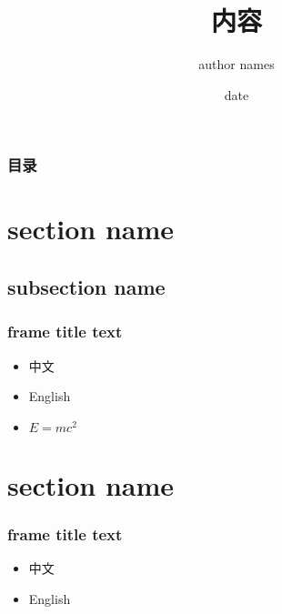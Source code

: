 ﻿\documentclass[14pt]{beamer}
\begin{document}
\title{内容}
\author{author names}
\date{date}
\maketitle
\begin{frame}\frametitle{目录}
\tableofcontents
\end{frame}
\section{section name}
\subsection{subsection name}
\begin{frame}\frametitle{frame title text}
\begin{itemize}
\item 中文
\item English
\item $E=mc^2$
\end{itemize}
\end{frame}
\section{section name}
\begin{frame}\frametitle{frame title text}
\begin{itemize}
\item 中文
\item English
\end{itemize}
\end{frame}
\end{document}
